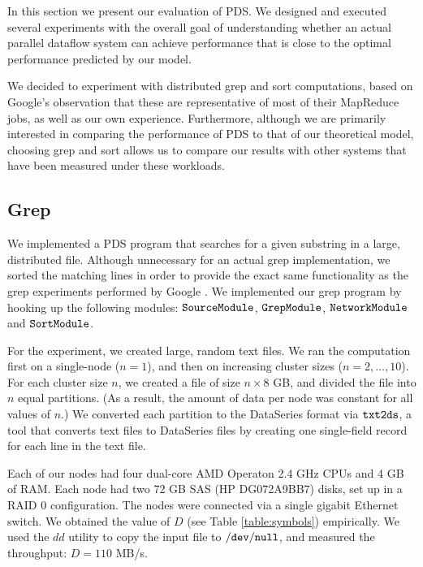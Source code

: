 \documentclass[ 11pt, letterpaper]{article}%
\begin{document}

In this section we present our evaluation of PDS. We designed and executed
several experiments with the overall goal of understanding whether an actual
parallel dataflow system can achieve performance that is close to the optimal
performance predicted by our model.

We decided to experiment with distributed grep and sort computations, based on
Google's observation that these are representative of most of their MapReduce
jobs, as well as our own experience. Furthermore, although we are primarily
interested in comparing the performance of PDS to that of our theoretical
model, choosing grep and sort allows us to compare our results with other
systems that have been measured under these workloads.

\subsection{Grep}

We implemented a PDS program that searches for a given substring in
a large, distributed file. Although unnecessary for an actual grep
implementation, we sorted the matching lines in order to provide the exact same
functionality as the grep experiments performed by Google \cite{mapreduce}. We
implemented our grep program by hooking up the following modules:
$\tt SourceModule$, $\tt GrepModule$, $\tt NetworkModule$ and $\tt SortModule$.

For the experiment, we created large, random text files. We ran the computation
first on a single-node ($n = 1$), and then on increasing cluster sizes ($n = 2,
\ldots, 10$). For each cluster size $n$, we created a file of size $n \times 8$
GB, and divided the file into $n$ equal partitions. (As a result, the amount
of data per node was constant for all values of $n$.) We converted each
partition to the DataSeries format via $\tt txt2ds$, a tool that converts text files to DataSeries files by creating one single-field record for each line in
the text file.

Each of our nodes had four dual-core AMD Operaton 2.4 GHz CPUs and 4 GB of RAM.
Each node had two 72 GB SAS (HP DG072A9BB7) disks, set up in a RAID 0
configuration. The nodes were connected via a single gigabit Ethernet switch.
We obtained the value of $D$ (see Table \ref{table:symbols})
empirically. We used the $dd$ utility to copy the input file to $\tt /dev/null$,
and measured the throughput: $D = 110$ MB/s.
\end{document}
